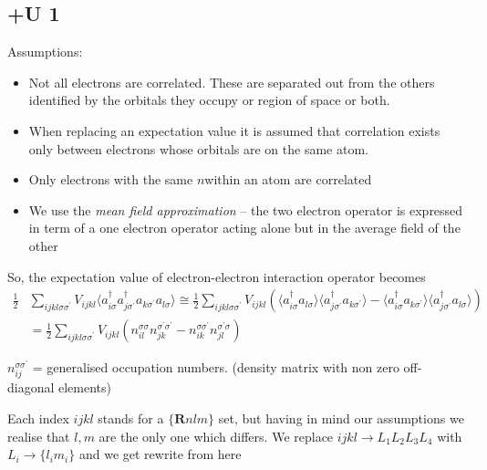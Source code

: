 \subsection{+U 1}
\par{Assumptions:}
\begin{itemize}
\item{Not all electrons are correlated. These are separated out from the others identified by the orbitals they occupy or region of space or both.}
\item{When replacing an expectation value it is assumed that correlation exists only between electrons whose orbitals are on the same atom. }
\item{Only electrons with the same $n$within an atom are correlated}
\item {We use the \textit{mean field approximation} -- the two electron operator is expressed in term of a one electron operator acting alone but in the average field of the other}
\end{itemize}
\par{So, the expectation value of electron-electron interaction operator becomes}
\begin{equation}
\begin{split}
\frac{1}{2}&\sum_{ijkl\sigma\sigma^\prime}V_{ijkl}\langle a_{i\sigma}^{\dag}a_{j\sigma^\prime}^{\dag}a_{k\sigma^\prime}a_{l\sigma}\rangle
\cong \frac{1}{2}\sum_{ijkl\sigma\sigma^\prime}V_{ijkl}(\langle a_{i\sigma}^{\dag}a_{l\sigma} \rangle \langle a_{j\sigma^\prime}^{\dag}a_{k\sigma^\prime} \rangle -
\langle a_{i\sigma}^{\dag}a_{k\sigma^\prime}\rangle \langle a_{j\sigma^\prime}^{\dag}a_{l\sigma} \rangle )\\
&=\frac{1}{2}\sum_{ijkl\sigma\sigma^\prime}V_{ijkl}(n_{il}^{\sigma\sigma}n_{jk}^{\sigma^\prime\sigma^\prime}-
n_{ik}^{\sigma\sigma^\prime}n_{jl}^{\sigma^\prime\sigma})
\end{split}
\end{equation}
\par{$n_{ij}^{\sigma\sigma^\prime}$ = generalised occupation numbers. (density matrix with non zero off-diagonal elements)}
\par{Each index $ijkl$ stands for a $ \lbrace \bm{R}nlm \rbrace $ set, but having in mind our assumptions we realise
that $l,m$ are the only one which differs. We replace ${ijkl} \rightarrow {L_1L_2L_3L_4}$ with $L_i \rightarrow \lbrace l_im_i \rbrace$ and we get}
rewrite from here
